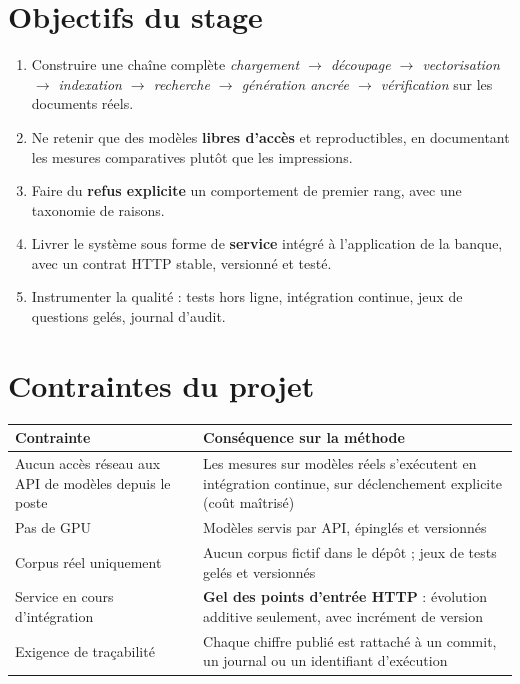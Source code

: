 \documentclass[a4paper,12pt]{report}
\begin{document}
\section{Objectifs du stage}
\begin{enumerate}
  \item Construire une chaîne complète \emph{chargement $\rightarrow$ découpage $\rightarrow$
        vectorisation $\rightarrow$ indexation $\rightarrow$ recherche $\rightarrow$ génération
        ancrée $\rightarrow$ vérification} sur les documents réels.
  \item Ne retenir que des modèles \textbf{libres d'accès} et reproductibles, en documentant les
        mesures comparatives plutôt que les impressions.
  \item Faire du \textbf{refus explicite} un comportement de premier rang, avec une taxonomie de
        raisons.
  \item Livrer le système sous forme de \textbf{service} intégré à l'application de la banque,
        avec un contrat HTTP stable, versionné et testé.
  \item Instrumenter la qualité : tests hors ligne, intégration continue, jeux de questions gelés,
        journal d'audit.
\end{enumerate}

\section{Contraintes du projet}
\begin{table}[H]
\centering
\small
\begin{tabular}{p{6.0cm}p{8.2cm}}
\toprule
\textbf{Contrainte} & \textbf{Conséquence sur la méthode} \\
\midrule
Aucun accès réseau aux API de modèles depuis le poste & Les mesures sur modèles réels s'exécutent
en intégration continue, sur déclenchement explicite (coût maîtrisé) \\
Pas de GPU & Modèles servis par API, épinglés et versionnés \\
Corpus réel uniquement & Aucun corpus fictif dans le dépôt ; jeux de tests gelés et versionnés \\
Service en cours d'intégration & \textbf{Gel des points d'entrée HTTP} : évolution additive
seulement, avec incrément de version \\
Exigence de traçabilité & Chaque chiffre publié est rattaché à un commit, un journal ou un
identifiant d'exécution \\
\bottomrule
\end{tabular}
\end{table}
\end{document}
